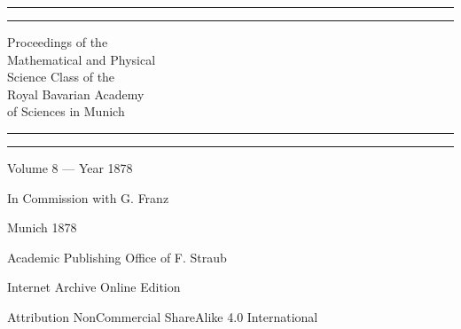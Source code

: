 \documentclass[a4paper, 12pt, oneside]{article}
\begin{document}
\begin{titlepage} %
	\centering %
	\scshape %

	
	\rule{\textwidth}{1.6pt}\vspace*{-\baselineskip}\vspace*{2pt} %
	\rule{\textwidth}{0.4pt} %
	
	\vspace{1\baselineskip} %
	
	{\LARGE Proceedings of the\\[0.05in] Mathematical and Physical\\[0.05in] Science Class of the\\[0.05in] Royal Bavarian Academy\\[0.15in] of Sciences in Munich}
	
	\vspace{1\baselineskip} %

	\rule{\textwidth}{0.4pt}\vspace*{-\baselineskip}\vspace{3.2pt} %
	\rule{\textwidth}{1.6pt} %
	
	\vspace{1\baselineskip} %
	
	
	{Volume 8 --- Year 1878} %
	
	\vspace*{1\baselineskip} %
	
    {\small In Commission with G. Franz} %
    
	
	\vspace{1\baselineskip}

    \vspace*{\fill}

	Munich 1878
	
	Academic Publishing Office of F. Straub

    \vspace{0.5\baselineskip} %

    Internet Archive Online Edition  %
	
	{\small Attribution NonCommercial ShareAlike 4.0 International } %
\end{titlepage}
\setlength{\parskip}{1mm plus1mm minus1mm}
\clearpage
\tableofcontents
\clearpage
\end{document}
